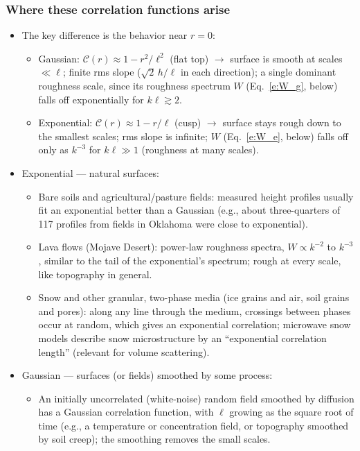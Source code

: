 \documentclass[11pt, oneside]{article}
\begin{document}
\subsubsection{Where these correlation functions arise}

\begin{itemize}
	\item The key difference is the behavior near $r = 0$:
	\begin{itemize}
		\item Gaussian: $\mathcal{C}(r) \approx 1 - r^2/\ell^2$ (flat top) $\rightarrow$ surface is smooth at scales $\ll \ell$; finite rms slope ($\sqrt{2}\,h/\ell$ in each direction); a single dominant roughness scale, since its roughness spectrum $W$ (Eq.~\eqref{e:W_g}, below) falls off exponentially for $k\ell \gtrsim 2$.
		\item Exponential: $\mathcal{C}(r) \approx 1 - r/\ell$ (cusp) $\rightarrow$ surface stays rough down to the smallest scales; rms slope is infinite; $W$ (Eq.~\eqref{e:W_e}, below) falls off only as $k^{-3}$ for $k\ell \gg 1$ (roughness at many scales).
	\end{itemize}
	\item Exponential --- natural surfaces:
	\begin{itemize}
		\item Bare soils and agricultural/pasture fields: measured height profiles usually fit an exponential better than a Gaussian (e.g., about three-quarters of 117 profiles from fields in Oklahoma were close to exponential).
		\item Lava flows (Mojave Desert): power-law roughness spectra, $W \propto k^{-2}$ to $k^{-3}$, similar to the tail of the exponential's spectrum; rough at every scale, like topography in general.
		\item Snow and other granular, two-phase media (ice grains and air, soil grains and pores): along any line through the medium, crossings between phases occur at random, which gives an exponential correlation; microwave snow models describe snow microstructure by an ``exponential correlation length'' (relevant for volume scattering).
	\end{itemize}
	\item Gaussian --- surfaces (or fields) smoothed by some process:
	\begin{itemize}
		\item An initially uncorrelated (white-noise) random field smoothed by diffusion has a Gaussian correlation function, with $\ell$ growing as the square root of time (e.g., a temperature or concentration field, or topography smoothed by soil creep); the smoothing removes the small scales.

\end{itemize}
\end{itemize}
\end{document}
